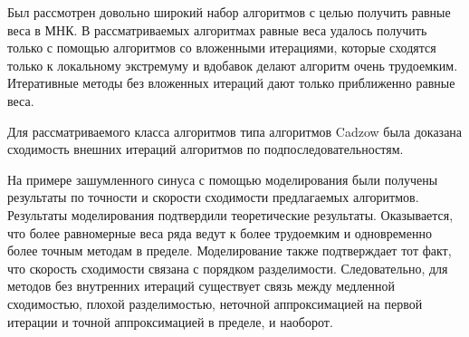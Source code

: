\documentclass[12pt, specialist, subf,href,colorlinks=true,substylefile = spbu.rtx]{disser}
\theoremstyle{remark}
\theoremstyle{definition}
\begin{document}
Был рассмотрен довольно широкий набор алгоритмов с целью получить равные веса в МНК. В рассматриваемых алгоритмах равные веса удалось
получить только с помощью алгоритмов со вложенными итерациями, которые сходятся только к локальному экстремуму и вдобавок делают алгоритм очень трудоемким.
Итеративные методы без вложенных итераций дают только приближенно равные веса.

Для рассматриваемого класса алгоритмов типа алгоритмов Cadzow была доказана сходимость внешних итераций алгоритмов по подпоследовательностям.

На примере зашумленного синуса с помощью моделирования были получены результаты по точности и скорости сходимости предлагаемых алгоритмов. Результаты моделирования подтвердили теоретические результаты. Оказывается, что более равномерные веса ряда ведут  к более трудоемким и одновременно более точным методам в пределе. Моделирование также подтверждает тот факт, что скорость сходимости связана с порядком разделимости. Следовательно, для методов без внутренних итераций существует связь между медленной сходимостью, плохой разделимостью, неточной аппроксимацией на первой итерации и точной аппроксимацией в пределе, и наоборот.



\end{document}
